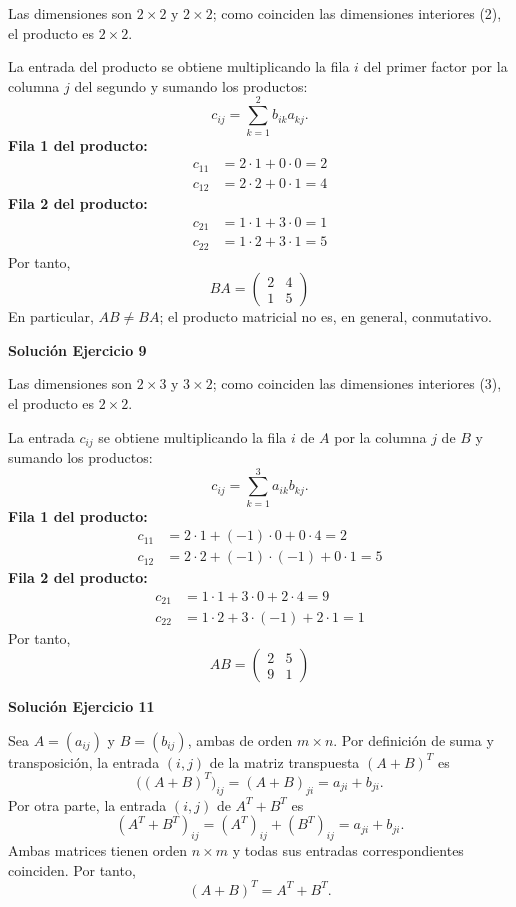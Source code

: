 \documentclass[12pt]{article}
\theoremstyle{remark}
\begin{document}
Las dimensiones son $2\times2$ y $2\times2$; como coinciden las dimensiones interiores (2), el producto es $2\times2$.

La entrada del producto se obtiene multiplicando la fila $i$ del primer factor por la columna $j$ del segundo y sumando los productos:
\[
c_{ij}=\sum_{k=1}^{2} b_{ik}a_{kj}.
\]
\textbf{Fila 1 del producto:}
\[
\begin{aligned}c_{11}&=2\cdot 1+0\cdot 0=2\\c_{12}&=2\cdot 2+0\cdot 1=4\end{aligned}
\]
\textbf{Fila 2 del producto:}
\[
\begin{aligned}c_{21}&=1\cdot 1+3\cdot 0=1\\c_{22}&=1\cdot 2+3\cdot 1=5\end{aligned}
\]
Por tanto,
\[
\boxed{BA=\begin{pmatrix}2&4\\1&5\end{pmatrix}}
\]
En particular, $AB\ne BA$; el producto matricial no es, en general, conmutativo.


\par\bigskip\noindent\textbf{Solución Ejercicio 9}\par\nobreak
Las dimensiones son $2\times3$ y $3\times2$; como coinciden las dimensiones interiores (3), el producto es $2\times2$.

La entrada $c_{ij}$ se obtiene multiplicando la fila $i$ de $A$ por la columna $j$ de $B$ y sumando los productos:
\[
c_{ij}=\sum_{k=1}^{3} a_{ik}b_{kj}.
\]
\textbf{Fila 1 del producto:}
\[
\begin{aligned}c_{11}&=2\cdot 1+(-1)\cdot 0+0\cdot 4=2\\c_{12}&=2\cdot 2+(-1)\cdot (-1)+0\cdot 1=5\end{aligned}
\]
\textbf{Fila 2 del producto:}
\[
\begin{aligned}c_{21}&=1\cdot 1+3\cdot 0+2\cdot 4=9\\c_{22}&=1\cdot 2+3\cdot (-1)+2\cdot 1=1\end{aligned}
\]
Por tanto,
\[
\boxed{AB=\begin{pmatrix}2&5\\9&1\end{pmatrix}}
\]

\par\bigskip\noindent\textbf{Solución Ejercicio 11}\par\nobreak
Sea $A=(a_{ij})$ y $B=(b_{ij})$, ambas de orden $m\times n$. Por definición de suma y transposición, la entrada $(i,j)$ de la matriz transpuesta $(A+B)^T$ es
\[
\bigl((A+B)^T\bigr)_{ij}=(A+B)_{ji}=a_{ji}+b_{ji}.
\]
Por otra parte, la entrada $(i,j)$ de $A^T+B^T$ es
\[
(A^T+B^T)_{ij}=(A^T)_{ij}+(B^T)_{ij}=a_{ji}+b_{ji}.
\]
Ambas matrices tienen orden $n\times m$ y todas sus entradas correspondientes coinciden. Por tanto,
\[
\boxed{(A+B)^T=A^T+B^T}.
\]
\end{document}
